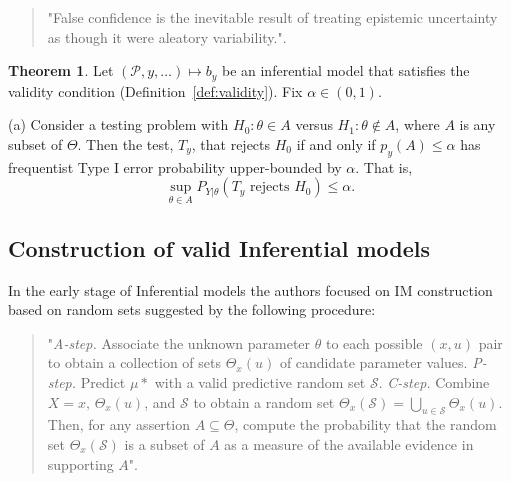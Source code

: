 \documentclass[
]{report}
\theoremstyle{definition}
\newtheorem{theorem}{Theorem}
\theoremstyle{definition}
\begin{document}
\begin{quote}
"False confidence is the inevitable result of treating epistemic uncertainty as though it were aleatory variability."\cite{balch_satellite_2019}.
\end{quote}

\begin{theorem}
Let $(\mathscr{P}, y, \dots) \mapsto b_y$ be an inferential model that satisfies the validity condition (Definition~\ref{def:validity}). Fix $\alpha \in (0,1)$.

(a) Consider a testing problem with $H_0 : \theta \in A$ versus $H_1 : \theta \notin A$, where $A$ is any subset of $\Theta$. Then the test, $T_y$, that rejects $H_0$ if and only if $p_y(A) \leq \alpha$ has frequentist Type I error probability upper-bounded by $\alpha$. That is,
$$\sup_{\theta \in A} P_{Y|\theta} (T_y \text{ rejects } H_0) \leq \alpha .$$
\end{theorem}

\subsection{Construction of valid Inferential models}

In the early stage of Inferential models the authors focused on IM
construction based on random sets suggested by the following procedure:

\begin{quote}
"\textit{A-step. } Associate the unknown parameter $\theta$ to each possible $(x, u)$ pair to obtain a collection of sets $\Theta_x(u)$ of candidate parameter values. \newline
\textit{P-step. } Predict $\mu*$ with a valid predictive random set $\mathcal{S}$. \newline
\textit{C-step. } Combine $X = x, \, \Theta_x (u)$, and $\mathcal{S}$ to obtain a random set $\Theta_x (\mathcal{S}) = \bigcup_{u \in {\mathcal{S}}} \Theta_x(u)$. Then, for any assertion $A \subseteq \Theta$, compute the probability that the random set $\Theta_x (\mathcal{S})$ is a subset of $A$ as a measure of the available evidence in supporting $A$"\cite{martin_inferential_2013}.
\end{quote}
\end{document}

